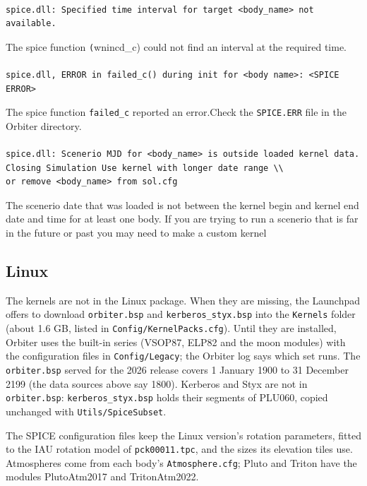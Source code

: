 \documentclass[Orbiter Technical Reference.tex]{subfiles}
\begin{document}
\paragraph{}
\begin{verbatim}
spice.dll: Specified time interval for target <body_name> not available.
\end{verbatim}
The spice function \texttt(wnincd\_c) could not find an interval at the required time.

\paragraph{}
\begin{verbatim}
spice.dll, ERROR in failed_c() during init for <body name>: <SPICE ERROR>
\end{verbatim}
The spice function \texttt{failed\_c} reported an error.Check the \texttt{SPICE.ERR} file in the Orbiter directory.

\paragraph{}
\begin{verbatim}
spice.dll: Scenerio MJD for <body_name> is outside loaded kernel data.
Closing Simulation Use kernel with longer date range \\
or remove <body_name> from sol.cfg
\end{verbatim}
The scenerio date that was loaded is not between the kernel begin and kernel end date and time for at least one body.
If you are trying to run a scenerio that is far in the future or past you may need to make a custom kernel 


\subsection{Linux}
The kernels are not in the Linux package. When they are missing, the Launchpad offers to download \texttt{orbiter.bsp} and \texttt{kerberos\_styx.bsp} into the \texttt{Kernels} folder (about 1.6 GB, listed in \texttt{Config/KernelPacks.cfg}). Until they are installed, Orbiter uses the built-in series (VSOP87, ELP82 and the moon modules) with the configuration files in \texttt{Config/Legacy}; the Orbiter log says which set runs. The \texttt{orbiter.bsp} served for the 2026 release covers 1 January 1900 to 31 December 2199 (the data sources above say 1800). Kerberos and Styx are not in \texttt{orbiter.bsp}: \texttt{kerberos\_styx.bsp} holds their segments of PLU060\cite{PLU060}, copied unchanged with \texttt{Utils/SpiceSubset}.

The SPICE configuration files keep the Linux version's rotation parameters, fitted to the IAU rotation model of \texttt{pck00011.tpc}, and the sizes its elevation tiles use. Atmospheres come from each body's \texttt{Atmosphere.cfg}; Pluto and Triton have the modules PlutoAtm2017 and TritonAtm2022.
\end{document}
